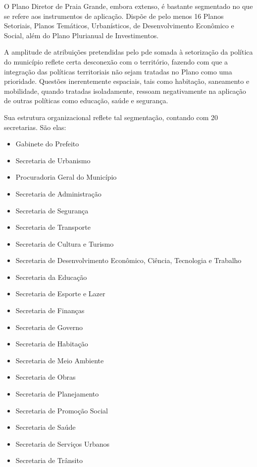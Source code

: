 	O Plano Diretor de Praia Grande, embora extenso, é bastante segmentado no que se refere aos instrumentos de aplicação. Dispõe de pelo menos 16 Planos Setoriais, Planos Temáticos, Urbanísticos, de Desenvolvimento Econômico e Social, além do Plano Plurianual de Investimentos. 
	
	A amplitude de atribuições pretendidas pelo \gls{pde} somada à setorização da política do município reflete certa desconexão com o território, fazendo com que a integração das políticas territoriais não sejam tratadas no Plano como uma prioridade. Questões inerentemente espaciais, tais como habitação, saneamento e mobilidade, quando tratadas isoladamente, ressoam negativamente na aplicação de outras políticas \textemdash como educação, saúde e segurança. 
	
	Sua estrutura organizacional reflete tal segmentação, contando com 20 secretarias. São elas:
	
	\begin{itemize}
		\item Gabinete do Prefeito
		\item Secretaria de Urbanismo
		\item Procuradoria Geral do Município
		\item Secretaria de Administração
		\item Secretaria de Segurança
		\item Secretaria de Transporte
		\item Secretaria de Cultura e Turismo
		\item Secretaria de Desenvolvimento Econômico, Ciência, Tecnologia e Trabalho
		\item Secretaria da Educação
		\item Secretaria de Esporte e Lazer
		\item Secretaria de Finanças
		\item Secretaria de Governo
		\item Secretaria de Habitação
		\item Secretaria de Meio Ambiente
		\item Secretaria de Obras
		\item Secretaria de Planejamento
		\item Secretaria de Promoção Social
		\item Secretaria de Saúde
		\item Secretaria de Serviços Urbanos 
		\item Secretaria de Trânsito 
	\end{itemize}
	
